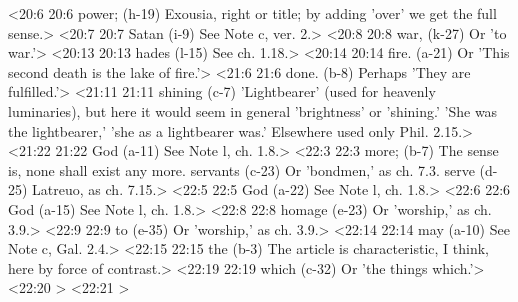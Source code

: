 <20:6 20:6  power; (h-19)  Exousia, right or title; by adding 'over' we get the full  sense.>
<20:7 20:7  Satan (i-9)  See Note c, ver. 2.>
<20:8 20:8  war, (k-27)  Or 'to war.'>
<20:13 20:13  hades (l-15)  See ch. 1.18.>
<20:14 20:14  fire. (a-21)  Or 'This second death is the lake of fire.'>
<21:6 21:6  done. (b-8)  Perhaps 'They are fulfilled.'>
<21:11 21:11  shining (c-7)  'Lightbearer' (used for heavenly luminaries), but here it  would seem in general 'brightness' or 'shining.' 'She was the  lightbearer,' 'she as a lightbearer was.' Elsewhere used only  Phil. 2.15.>
<21:22 21:22  God (a-11) See Note l, ch. 1.8.>
<22:3 22:3  more; (b-7)  The sense is, none shall exist any more.
  servants (c-23)  Or 'bondmen,' as ch. 7.3.
  serve (d-25)  Latreuo, as ch. 7.15.>
<22:5 22:5  God (a-22) See Note l, ch. 1.8.>
<22:6 22:6  God (a-15)  See Note l, ch. 1.8.>
<22:8 22:8  homage (e-23) Or 'worship,' as ch. 3.9.>
<22:9 22:9  to (e-35)  Or 'worship,' as ch. 3.9.>
<22:14 22:14  may (a-10)  See Note c, Gal. 2.4.>
<22:15 22:15  the (b-3)  The article is characteristic, I think, here by force of  contrast.>
<22:19 22:19  which (c-32)  Or 'the things which.'>
<22:20 >
<22:21 >

